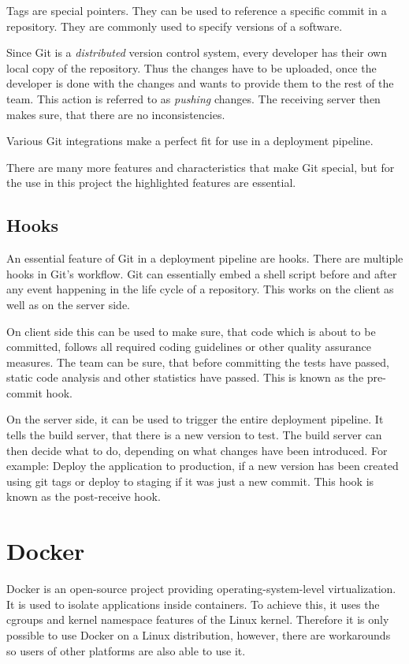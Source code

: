 Tags are special pointers. They can be used to reference a specific commit in a
repository. They are commonly used to specify versions of a software.

Since Git is a \textit{distributed} version control system, every developer has
their own local copy of the repository. Thus the changes have to be uploaded,
once the developer is done with the changes and wants to provide them to the
rest of the team. This action is referred to as \textit{pushing} changes. The
receiving server then makes sure, that there are no inconsistencies.

Various Git integrations make a perfect fit for use in a deployment
pipeline.

There are many more features and characteristics that make Git special, but for
the use in this project the highlighted features are essential.

\subsection{Hooks}

An essential feature of Git in a deployment pipeline are hooks. There are
multiple hooks in Git's workflow. Git can essentially embed a shell script
before and after any event happening in the life cycle of a repository. This
works on the client as well as on the server side.

On client side this can be used to make sure, that code which is about to be
committed, follows all required coding guidelines or other quality assurance
measures. The team can be sure, that before committing the tests have passed,
static code analysis and other statistics have passed. This is known as the
pre-commit hook.

On the server side, it can be used to trigger the entire deployment pipeline.
It tells the build server, that there is a new version to test. The build
server can then decide what to do, depending on what changes have been
introduced. For example: Deploy the application to production, if a new version
has been created using git tags or deploy to staging if it was just a new
commit. This hook is known as the post-receive hook.

\section{Docker}

Docker is an open-source project providing operating-system-level
virtualization. It is used to isolate applications inside containers. To
achieve this, it uses the cgroups and kernel namespace features of the Linux
kernel. Therefore it is only possible to use Docker on a Linux distribution,
however, there are workarounds so users of other platforms are also able to
use it.


